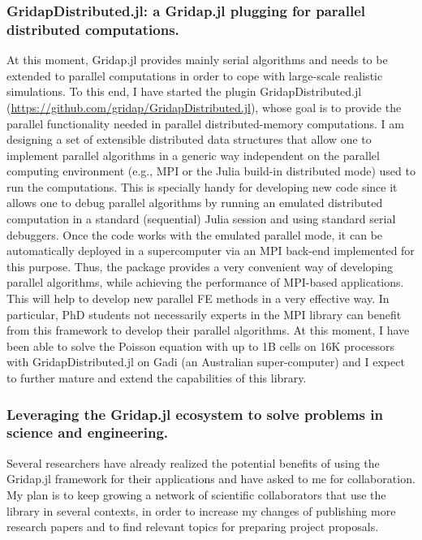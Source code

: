 \documentclass{article}
\begin{document}
 
\subsubsection{GridapDistributed.jl: a  Gridap.jl plugging for parallel distributed computations.} 

At this moment, Gridap.jl provides mainly serial algorithms and needs to be extended to parallel computations in order to cope with large-scale realistic simulations. To this end, I have started the plugin GridapDistributed.jl (\url{https://github.com/gridap/GridapDistributed.jl}), whose goal is to provide the parallel functionality needed in parallel distributed-memory computations. I am designing a set of extensible distributed data structures that allow one to implement parallel algorithms in a generic way independent on the parallel computing environment (e.g., MPI or the Julia build-in distributed mode) used to run the computations. This is specially handy for developing new code since it allows one to debug parallel algorithms by running an emulated distributed computation in a standard (sequential) Julia session and using standard serial debuggers.  Once the code works with the emulated parallel mode, it can be automatically deployed in a supercomputer via an MPI back-end implemented for this purpose. Thus, the package provides a very convenient way of developing parallel algorithms, while achieving the performance of MPI-based applications. This will help to develop new parallel FE methods in a very effective way. In particular, PhD students not necessarily experts in the MPI library can benefit from this framework to develop their parallel algorithms. At this moment, I have been able to solve the Poisson equation with up to 1B cells on 16K processors with GridapDistributed.jl on Gadi (an Australian super-computer) and I expect to further mature and extend the capabilities of this library.  
 
\subsubsection{Leveraging the Gridap.jl ecosystem to solve problems in science and engineering.}

Several researchers have already realized the potential benefits of using the Gridap.jl framework for their applications and have asked to me for collaboration. My plan is to keep growing a network of scientific collaborators that use the library in several contexts, in order to increase my changes of publishing more research papers and to find relevant topics for preparing project proposals.
\end{document}
